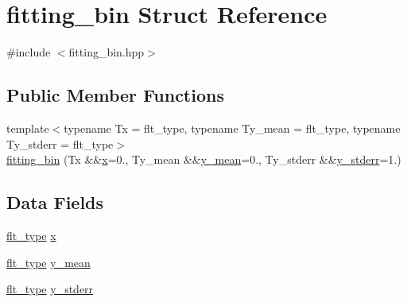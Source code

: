 \hypertarget{structfitting__bin}{\section{fitting\-\_\-bin Struct Reference}
\label{structfitting__bin}
}


{\ttfamily \#include $<$fitting\-\_\-bin.\-hpp$>$}

\subsection*{Public Member Functions}
\begin{DoxyCompactItemize}
\item 
{\footnotesize template$<$typename Tx  = flt\-\_\-type, typename Ty\-\_\-mean  = flt\-\_\-type, typename Ty\-\_\-stderr  = flt\-\_\-type$>$ }\\\hyperlink{structfitting__bin_a39e40a834cd7624af91b3c56fe162729}{fitting\-\_\-bin} (Tx \&\&\hyperlink{structfitting__bin_a7b98fe0d678f3a4fcf198240bc3b93ad}{x}=0., Ty\-\_\-mean \&\&\hyperlink{structfitting__bin_a96cd30fcacd3caad74b5467adb552acf}{y\-\_\-mean}=0., Ty\-\_\-stderr \&\&\hyperlink{structfitting__bin_a94fbb052ddb257465dfd714a06614817}{y\-\_\-stderr}=1.)
\end{DoxyCompactItemize}
\subsection*{Data Fields}
\begin{DoxyCompactItemize}
\item 
\hyperlink{lib_2IceBRG__main_2common_8h_ad0f130a56eeb944d9ef2692ee881ecc4}{flt\-\_\-type} \hyperlink{structfitting__bin_a7b98fe0d678f3a4fcf198240bc3b93ad}{x}
\item 
\hyperlink{lib_2IceBRG__main_2common_8h_ad0f130a56eeb944d9ef2692ee881ecc4}{flt\-\_\-type} \hyperlink{structfitting__bin_a96cd30fcacd3caad74b5467adb552acf}{y\-\_\-mean}
\item 
\hyperlink{lib_2IceBRG__main_2common_8h_ad0f130a56eeb944d9ef2692ee881ecc4}{flt\-\_\-type} \hyperlink{structfitting__bin_a94fbb052ddb257465dfd714a06614817}{y\-\_\-stderr}
\end{DoxyCompactItemize}


